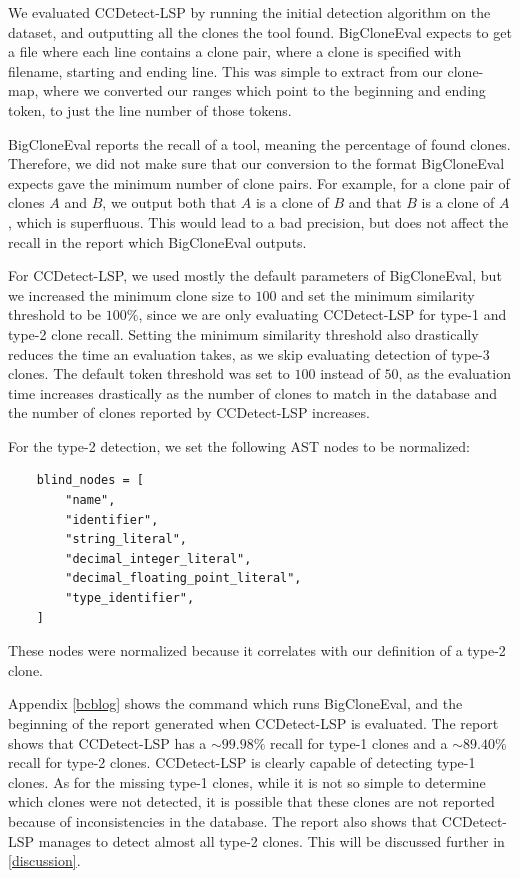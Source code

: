 We evaluated CCDetect-LSP by running the initial detection algorithm on the dataset, and
outputting all the clones the tool found. BigCloneEval expects to get a file where each
line contains a clone pair, where a clone is specified with filename, starting and
ending line. This was simple to extract from our clone-map, where we converted our ranges
which point to the beginning and ending token, to just the line number of those tokens.

BigCloneEval reports the recall of a tool, meaning the percentage of found clones.
Therefore, we did not make sure that our conversion to the format BigCloneEval expects
gave the minimum number of clone pairs. For example, for a clone pair of clones $A$ and
$B$, we output both that $A$ is a clone of $B$ and that $B$ is a clone of $A$, which is
superfluous. This would lead to a bad precision, but does not affect the recall in the
report which BigCloneEval outputs.

For CCDetect-LSP, we used mostly the default parameters of BigCloneEval, but we increased
the minimum clone size to $100$ and set the minimum similarity threshold to be $100\%$,
since we are only evaluating CCDetect-LSP for type-1 and type-2 clone recall. Setting the
minimum similarity threshold also drastically reduces the time an evaluation takes, as we
skip evaluating detection of type-3 clones. The default token threshold was set to $100$
instead of $50$, as the evaluation time increases drastically as the number of clones to
match in the database and the number of clones reported by CCDetect-LSP increases.

For the type-2 detection, we set the following AST nodes to be normalized:

\begin{lstlisting}
    blind_nodes = [
        "name",
        "identifier",
        "string_literal",
        "decimal_integer_literal",
        "decimal_floating_point_literal",
        "type_identifier",
    ]
\end{lstlisting}

These nodes were normalized because it correlates with our definition of a type-2 clone.

Appendix \ref{bcblog} shows the command which runs BigCloneEval, and the beginning of the
report generated when CCDetect-LSP is evaluated. The report shows that CCDetect-LSP has a
${\sim}99.98\%$ recall for type-1 clones and a ${\sim}89.40\%$ recall for type-2 clones.
CCDetect-LSP is clearly capable of detecting type-1 clones. As for the missing type-1
clones, while it is not so simple to determine which clones were not detected, it is
possible that these clones are not reported because of inconsistencies in the database.
The report also shows that CCDetect-LSP manages to detect almost all type-2 clones. This
will be discussed further in \cref{discussion}.

